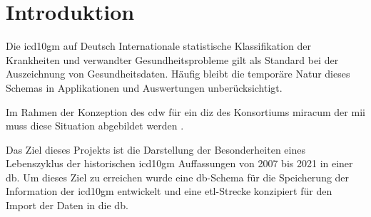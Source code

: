 \section{Introduktion}

	Die \ac{icd10gm} auf Deutsch Internationale statistische Klassifikation der Krankheiten und  verwandter Gesundheitsprobleme \cite{icd10} gilt als Standard bei der Auszeichnung von Gesundheitsdaten. Häufig bleibt die temporäre Natur dieses Schemas in Applikationen und Auswertungen unberücksichtigt.
	
	Im Rahmen der Konzeption des \ac{cdw} für ein  \ac{diz} des Konsortiums \ac{miracum} der \ac{mii} muss diese Situation abgebildet werden \cite{willidea}. 
	
	Das Ziel dieses Projekts ist die Darstellung der Besonderheiten eines Lebenszyklus der historischen \ac{icd10gm} Auffassungen von 2007 bis 2021 in einer \ac{db}. Um dieses Ziel zu erreichen wurde eine \ac{db}-Schema für die Speicherung der Information der \ac{icd10gm} entwickelt und eine \ac{etl}-Strecke konzipiert für den Import der Daten in die \ac{db}.
	
	